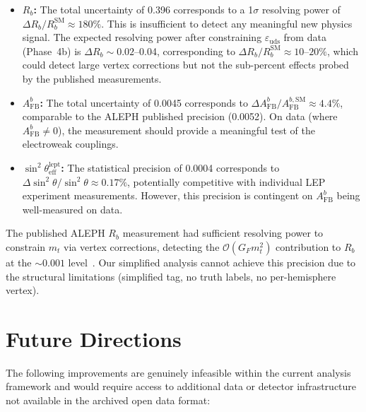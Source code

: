 \documentclass[11pt,a4paper]{article}
\begin{document}
\begin{itemize}
\item \textbf{$R_b$:} The total uncertainty of 0.396 corresponds to a 1$\sigma$ resolving
power of $\Delta R_b / R_b^\mathrm{SM} \approx 180\%$. This is insufficient to detect
any meaningful new physics signal. The expected resolving power after constraining
$\varepsilon_\mathrm{uds}$ from data (Phase~4b) is $\Delta R_b \sim 0.02$--0.04,
corresponding to $\Delta R_b / R_b^\mathrm{SM} \approx 10$--$20\%$, which could detect
large vertex corrections but not the sub-percent effects probed by the published
measurements.

\item \textbf{$A_\mathrm{FB}^b$:} The total uncertainty of 0.0045 corresponds to
$\Delta A_\mathrm{FB}^b / A_\mathrm{FB}^{b,\mathrm{SM}} \approx 4.4\%$, comparable
to the ALEPH published precision (0.0052). On data (where $A_\mathrm{FB}^b \neq 0$),
the measurement should provide a meaningful test of the electroweak couplings.

\item \textbf{$\sin^2\theta_\mathrm{eff}^\mathrm{lept}$:} The statistical precision
of 0.0004 corresponds to $\Delta \sin^2\theta / \sin^2\theta \approx 0.17\%$,
potentially competitive with individual LEP experiment measurements. However, this
precision is contingent on $A_\mathrm{FB}^b$ being well-measured on data.
\end{itemize}

The published ALEPH $R_b$ measurement had sufficient resolving power to constrain
$m_t$ via vertex corrections, detecting the $\mathcal{O}(G_F m_t^2)$ contribution
to $R_b$ at the $\sim 0.001$ level~\cite{ALEPH:Rb:1996}. Our simplified analysis
cannot achieve this precision due to the structural limitations (simplified tag,
no truth labels, no per-hemisphere vertex).

\FloatBarrier
{}
\section{Future Directions}
\label{sec:future}

The following improvements are genuinely infeasible within the current analysis
framework and would require access to additional data or detector infrastructure
not available in the archived open data format:
\end{document}
